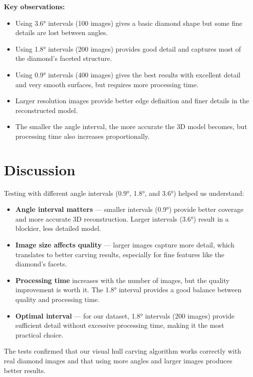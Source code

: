 \documentclass[a4paper,12pt]{article}
\begin{document}
\textbf{Key observations:}

\begin{itemize}
    \item Using 3.6° intervals (100 images) gives a basic diamond shape but some fine details are lost between angles.
    \item Using 1.8° intervals (200 images) provides good detail and captures most of the diamond's faceted structure.
    \item Using 0.9° intervals (400 images) gives the best results with excellent detail and very smooth surfaces, but requires more processing time.
    \item Larger resolution images provide better edge definition and finer details in the reconstructed model.
    \item The smaller the angle interval, the more accurate the 3D model becomes, but processing time also increases proportionally.
\end{itemize}

\section{Discussion}

Testing with different angle intervals (0.9°, 1.8°, and 3.6°) helped us understand:

\begin{itemize}
    \item \textbf{Angle interval matters} — smaller intervals (0.9°) provide better coverage and more accurate 3D reconstruction. Larger intervals (3.6°) result in a blockier, less detailed model.
    \item \textbf{Image size affects quality} — larger images capture more detail, which translates to better carving results, especially for fine features like the diamond's facets.
    \item \textbf{Processing time} increases with the number of images, but the quality improvement is worth it. The 1.8° interval provides a good balance between quality and processing time.
    \item \textbf{Optimal interval} — for our dataset, 1.8° intervals (200 images) provide sufficient detail without excessive processing time, making it the most practical choice.
\end{itemize}

The tests confirmed that our visual hull carving algorithm works correctly with real diamond images and that using more angles and larger images produces better results.
\end{document}
